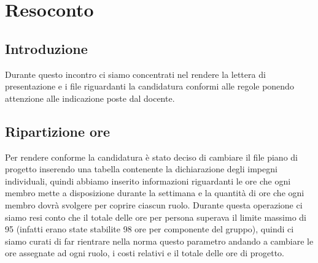 \section{Resoconto}
\subsection{Introduzione}
Durante questo incontro ci siamo concentrati nel rendere la lettera di presentazione e i file riguardanti la candidatura conformi alle regole ponendo attenzione alle indicazione poste dal docente. 

\subsection{Ripartizione ore}
Per rendere conforme la candidatura è stato deciso di cambiare il file piano di progetto inserendo una tabella contenente la dichiarazione degli impegni individuali, quindi abbiamo inserito informazioni riguardanti le ore che ogni membro mette a disposizione durante la settimana e la quantità di ore che ogni membro dovrà svolgere per coprire ciascun ruolo. Durante questa operazione ci siamo resi conto che il totale delle ore per persona superava il limite massimo di 95 (infatti erano state stabilite 98 ore per componente del gruppo), quindi ci siamo curati di far rientrare nella norma questo parametro andando a cambiare le ore assegnate ad ogni ruolo, i costi relativi e il totale delle ore di progetto. 

